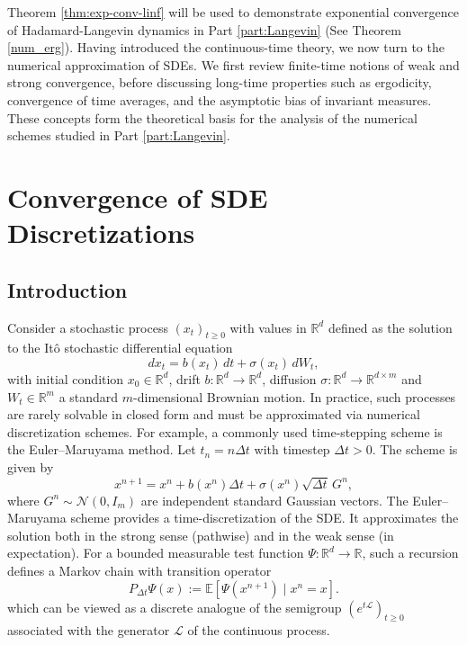 \documentclass[11pt, twoside]{report}
\begin{document}
Theorem \ref{thm:exp-conv-linf} will be used to demonstrate exponential convergence of Hadamard-Langevin dynamics in Part \ref{part:Langevin} (See Theorem \ref{num_erg}). Having introduced the continuous-time theory, we now turn to the numerical approximation of SDEs. We first review finite-time notions of weak and strong convergence, before discussing long-time properties such as ergodicity, convergence of time averages, and the asymptotic bias of invariant measures. These concepts form the theoretical basis for the analysis of the numerical schemes studied in Part \ref{part:Langevin}.
\section{Convergence of SDE Discretizations}

\subsection{Introduction}

Consider a stochastic process $(x_t)_{t\ge0}$ with values in $\mathbb{R}^d$ defined as the solution to the It\^{o} stochastic differential equation
\[
dx_t = b(x_t)\,dt + \sigma(x_t)\,dW_t,
\]
with initial condition $x_0 \in \mathbb{R}^d$, drift $b: \mathbb{R}^d \to \mathbb{R}^d$, diffusion $\sigma: \mathbb{R}^d \to \mathbb{R}^{d \times m}$ and $W_t \in \mathbb{R}^m$ a standard $m$-dimensional Brownian motion. In practice, such processes are rarely solvable in closed form and must be approximated via numerical discretization schemes. For example, a commonly used time-stepping scheme is the Euler–Maruyama method. Let $t_n = n\Delta t$ with timestep $\Delta t > 0$. The scheme is given by
\[
x^{n+1} = x^n + b(x^n)\Delta t + \sigma(x^n)\sqrt{\Delta t}\, G^n,
\]
where $G^n \sim \mathcal{N}(0, I_m)$ are independent standard Gaussian vectors. The Euler--Maruyama scheme provides a time-discretization of the SDE. It approximates the solution both in the strong sense (pathwise) and in the weak sense (in expectation). For a bounded measurable test function $\Psi : \mathbb{R}^d \to \mathbb{R}$, such a recursion defines a Markov chain with transition operator
\begin{equation}
P_{\Delta t} \Psi(x) := \mathbb{E}[\Psi(x^{n+1}) \mid x^n = x].
\end{equation}
which can be viewed as a discrete analogue of the semigroup $(e^{t\mathcal{L}})_{t \geq 0}$ associated with the generator $\mathcal{L}$ of the continuous process.
\end{document}
